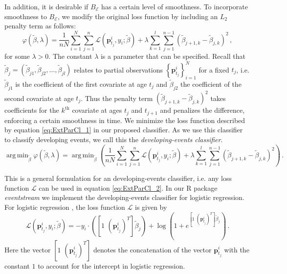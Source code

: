 \documentclass[a4paper,11pt]{article}
\DeclareMathOperator*{\argmin}{arg\,min}
\begin{document}
In addition, it is desirable if $B_{\mathscr{E}}$ has a certain level of smoothness. To incorporate smoothness to $B_{\mathscr{E}}$, we modify the original loss function by including an $L_2$ penalty term as follows:
\begin{equation}\label{eq:ExtParCl_1}
	\varphi\left(\tilde{\beta}, \lambda \right) = \frac{1}{nN} \sum_{i=1}^N \sum_{j=1}^n \mathscr{L} \left( \bm{p}^i_{t_j},y_i;\tilde{\beta} \right) + \lambda \sum_{k=1}^l\sum_{j=1}^{n-1} \left(\tilde{\beta}_{j+1,k} - \tilde{\beta}_{j,k} \right)^2 \, ,
\end{equation}
for some $\lambda >0 $. The constant $\lambda$ is a parameter that can be specified. Recall that $\tilde{\beta}_j = \left( \tilde{\beta}_{j1}, \tilde{\beta}_{j2}, \dots, \tilde{\beta}_{jl} \right)$ relates to partial observations $\left \{ \bm{p}^i_{t_j} \right \}_{i=1}^N$ for a fixed $t_j$, i.e. $\tilde{\beta}_{j1}$ is the coefficient of the first covariate at age $t_j$ and $\tilde{\beta}_{j2}$ the coefficient of the second covariate at age $t_j$. Thus the penalty term $ \left(\tilde{\beta}_{j+1,k} - \tilde{\beta}_{j,k} \right)^2$ takes coefficients for the $k^{\text{th}}$ covariate at ages $t_j$ and $t_{j+1}$ and penalizes the difference, enforcing a certain smoothness in time. We minimize the loss function described by equation \eqref{eq:ExtParCl_1} in our proposed classifier. As we use this classifier to classify developing events, we call this the \textit{developing-events classifier}.
\begin{equation}\label{eq:ExtParCl_2}
	\argmin_{\tilde{\beta}} \varphi\left(\tilde{\beta}, \lambda \right) = 	\argmin_{\tilde{\beta}} \left( \frac{1}{nN} \sum_{i=1}^N \sum_{j=1}^n \mathscr{L} \left( \bm{p}^i_{t_j},y_i;\tilde{\beta} \right) + \lambda \sum_{k=1}^l\sum_{j=1}^{n-1} \left(\tilde{\beta}_{j+1,k} - \tilde{\beta}_{j,k} \right)^2 \right) \, .
\end{equation}

This is a general formulation for an developing-events classifier, i.e. any loss function $\mathscr{L}$ can be used in equation \eqref{eq:ExtParCl_2}. In our R package \textit{eventstream} we implement the developing-events classifier for logistic regression. For logistic regression \cite{friedman2001elements}, the loss function $\mathscr{L}$ is given by
\begin{equation}\label{eq:LogReg}
	\mathscr{L} \left( \bm{p}^i_{t_j},y_i;\tilde{\beta} \right) = - y_i \cdot \left( \left[ 1 \, \, \left( \bm{p}^i_{t_j}\right)^T \right] \tilde{\beta}_{j} \right) + \log \left( 1+ e^{ \left[ 1 \, \, \left( \bm{p}^i_{t_j}\right)^T \right] \tilde{\beta}_{j}} \right) \, .
\end{equation}
Here the vector $\left[ 1 \, \, \left( \bm{p}^i_{t_j}\right)^T \right]$ denotes the concatenation of the vector $\bm{p}^i_{t_j}$ with the constant $1$ to account for the intercept in logistic regression. %
\end{document}
